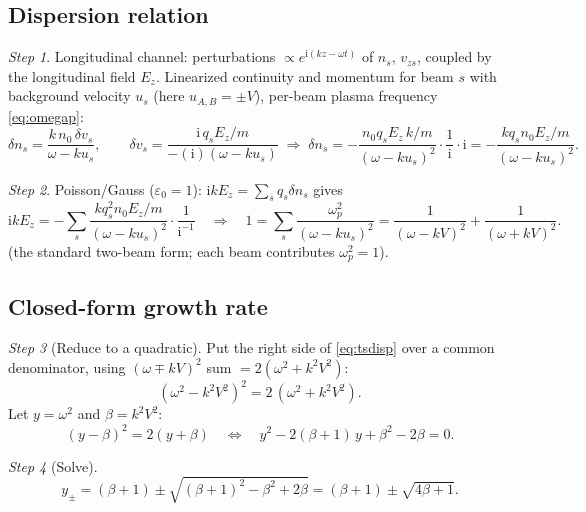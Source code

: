 \documentclass[11pt,a4paper]{article}
\numberwithin{equation}{section}
\theoremstyle{remark}
\newtheorem{step}{Step}[subsection]
\newcommand{\ii}{\mathrm{i}}
\begin{document}
\subsection{Dispersion relation}

\begin{step}
Longitudinal channel: perturbations $\propto e^{\ii(kz-\omega t)}$ of
$n_s$, $v_{zs}$, coupled by the longitudinal field $E_z$. Linearized
continuity and momentum for beam $s$ with background velocity $u_s$
(here $u_{A,B}=\pm V$), per-beam plasma frequency
\eqref{eq:omegap}:
\begin{equation}
\delta n_s=\frac{k\,n_0\,\delta v_s}{\omega-k u_s},\qquad
\delta v_s=\frac{\ii\,q_s E_z/m}{-(\ii)(\omega-ku_s)}
\;\Longrightarrow\;
\delta n_s=-\frac{n_0q_sE_z\,k/m}{(\omega-ku_s)^2}\cdot\frac1{\ii}\cdot\ii
=-\frac{kq_sn_0E_z/m}{(\omega-ku_s)^2}.
\end{equation}
\end{step}

\begin{step}
Poisson/Gauss ($\varepsilon_0=1$): $\ii kE_z=\sum_sq_s\delta n_s$ gives
\begin{equation}
\ii kE_z=-\sum_s\frac{kq_s^2n_0E_z/m}{(\omega-ku_s)^2}\cdot\frac1{\ii^{-1}}
\quad\Longrightarrow\quad
1=\sum_s\frac{\omega_{p}^2}{(\omega-ku_s)^2}
=\frac{1}{(\omega-kV)^2}+\frac{1}{(\omega+kV)^2}.
\label{eq:tsdisp}
\end{equation}
(the standard two-beam form; each beam contributes $\omega_p^2=1$).
\end{step}

\subsection{Closed-form growth rate}

\begin{step}[Reduce to a quadratic]
Put the right side of \eqref{eq:tsdisp} over a common denominator, using
$(\omega\mp kV)^2$ sum $=2(\omega^2+k^2V^2)$:
\begin{equation}
(\omega^2-k^2V^2)^2=2\,(\omega^2+k^2V^2).
\end{equation}
Let $y=\omega^2$ and $\beta=k^2V^2$:
\begin{equation}
(y-\beta)^2=2(y+\beta)
\quad\Longleftrightarrow\quad
y^2-2(\beta+1)\,y+\beta^2-2\beta=0 .
\end{equation}
\end{step}

\begin{step}[Solve]
\begin{equation}
y_\pm=(\beta+1)\pm\sqrt{(\beta+1)^2-\beta^2+2\beta}
=(\beta+1)\pm\sqrt{4\beta+1}.
\end{equation}
\end{step}
\end{document}
